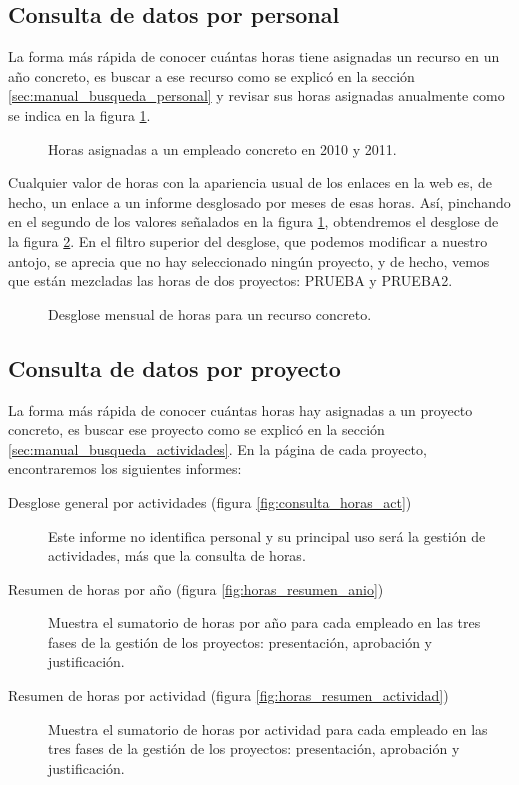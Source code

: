 \subsection{Consulta de datos por personal}

La forma más rápida de conocer cuántas horas tiene asignadas un recurso en un
año concreto, es buscar a ese recurso como se explicó en la sección
\ref{sec:manual_busqueda_personal} y revisar sus horas asignadas anualmente
como se indica en la figura \ref{fig:horas_anuales}.

\begin{figure}
\centering
{}
\caption{Horas asignadas a un empleado concreto en 2010 y 2011.}
\label{fig:horas_anuales}
\end{figure}

Cualquier valor de horas con la apariencia usual de los enlaces en la web es,
de hecho, un enlace a un informe desglosado por meses de esas horas. Así,
pinchando en el segundo de los valores señalados en la figura
\ref{fig:horas_anuales}, obtendremos el desglose de la figura
\ref{fig:desglose_horas}. En el filtro superior del desglose, que podemos
modificar a nuestro antojo, se aprecia que no hay seleccionado ningún proyecto,
y de hecho, vemos que están mezcladas las horas de dos proyectos: PRUEBA y
PRUEBA2.

\begin{figure}
\centering
{}
\caption{Desglose mensual de horas para un recurso concreto.}
\label{fig:desglose_horas}
\end{figure}

\subsection{Consulta de datos por proyecto}

La forma más rápida de conocer cuántas horas hay asignadas a un proyecto
concreto, es buscar ese proyecto como se explicó en la sección
\ref{sec:manual_busqueda_actividades}. En la página de cada proyecto,
encontraremos los siguientes informes:

\begin{description}
 \item [Desglose general por actividades (figura \ref{fig:consulta_horas_act})]
Este informe no identifica personal y su principal uso será la gestión de
actividades, más que la consulta de horas.
 \item [Resumen de horas por año (figura \ref{fig:horas_resumen_anio})] Muestra
el sumatorio de horas por año para cada empleado en las tres fases de la gestión
de los proyectos: presentación, aprobación y justificación.
 \item [Resumen de horas por actividad (figura
\ref{fig:horas_resumen_actividad})] Muestra el sumatorio de horas por actividad
para cada empleado en las tres fases de la gestión de los proyectos:
presentación, aprobación y justificación.
 
\end{description}

